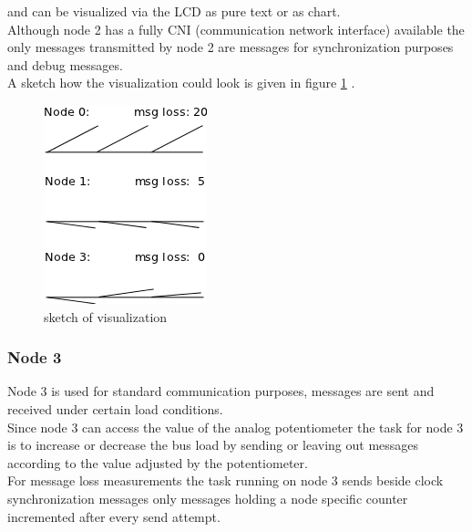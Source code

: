 and can be visualized via the LCD as pure text or as chart.\\

Although node 2 has a fully CNI (communication network interface) available the only messages transmitted by node 2 are messages for synchronization purposes and debug messages.\\

A sketch how the visualization could look is given in figure \ref{fig:app:specification:node2} .

\begin{figure}[h]
 \centering
 \includegraphics[scale=0.8]{../images/app_visu_sketch.png}
 \caption{sketch of visualization}
 \label{fig:app:specification:node2}
\end{figure}


\subsubsection{Node 3}
\label{sec:app:specification:node3}

Node 3 is used for standard communication purposes, messages are sent and received under certain load conditions.\\

Since node 3 can access the value of the analog potentiometer the task for node 3 is to increase or decrease the bus load by sending or leaving out messages according to the value adjusted by the potentiometer.\\

For message loss measurements the task running on node 3 sends beside clock synchronization messages only messages holding a node specific counter incremented after every send attempt.\\ 
